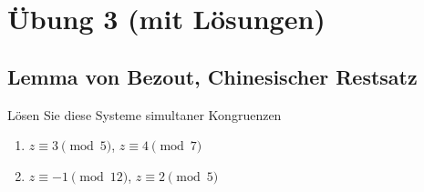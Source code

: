\section{Übung 3 (mit Lösungen)}
\subsection{Lemma von Bezout, Chinesischer Restsatz}

\begin{aufgabe}[Aufgabe 1]
Lösen Sie diese Systeme simultaner Kongruenzen
\begin{enumerate}[label=\alph*)]
\item $z \equiv 3 \pmod{5}$, \quad $z \equiv 4 \pmod{7}$
\item $z \equiv -1 \pmod{12}$, \quad $z \equiv 2 \pmod{5}$
\end{enumerate}
\end{aufgabe}

